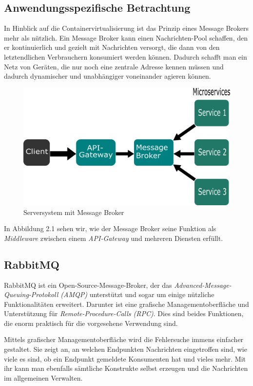\documentclass[12pt,a4paper]{scrartcl}
\begin{document}
\subsection{Anwendungsspezifische Betrachtung}
In Hinblick auf die Containervirtualisierung ist das Prinzip eines Message Brokers mehr als nützlich.
Ein Message Broker kann einen Nachrichten-Pool schaffen, den er kontinuierlich und gezielt mit Nachrichten versorgt, die dann von den letztendlichen Verbrauchern konsumiert werden können. Dadurch schafft man ein Netz von Geräten, die nur noch eine zentrale Adresse kennen müssen und dadurch dynamischer und unabhängiger voneinander agieren können. 

\begin{figure}[h!]
	\centering
	\includegraphics[scale=1.8]{MesBroSys.png}
	\caption[Selbst erstellte Grafik]{Serversystem mit Message Broker}
\end{figure}

In Abbildung 2.1 sehen wir, wie der Message Broker seine Funktion als \emph{Middleware} zwischen einem \emph{API-Gateway} und mehreren Diensten erfüllt.  

\subsection{RabbitMQ}
RabbitMQ ist ein Open-Source-Message-Broker, der das \emph{Advanced-Message-Queuing-Protokoll (AMQP)} unterstützt und sogar um einige nützliche Funktionalitäten erweitert\cite{rabExt}.
Darunter ist eine grafische Managementoberfläche und Unterstützung für \emph{Remote-Procedure-Calls (RPC)}. Dies sind beides Funktionen, die enorm praktisch für die vorgesehene Verwendung sind.

Mittels grafischer Managementoberfläche wird die Fehlersuche immens einfacher gestaltet. Sie zeigt an, an welchen Endpunkten Nachrichten eingetroffen sind, wie viele es sind, ob ein Endpunkt gemeldete Konsumenten hat und vieles mehr. Mit ihr kann man ebenfalls sämtliche Konstrukte selbst erzeugen und die Nachrichten im allgemeinen Verwalten. 
\end{document}
